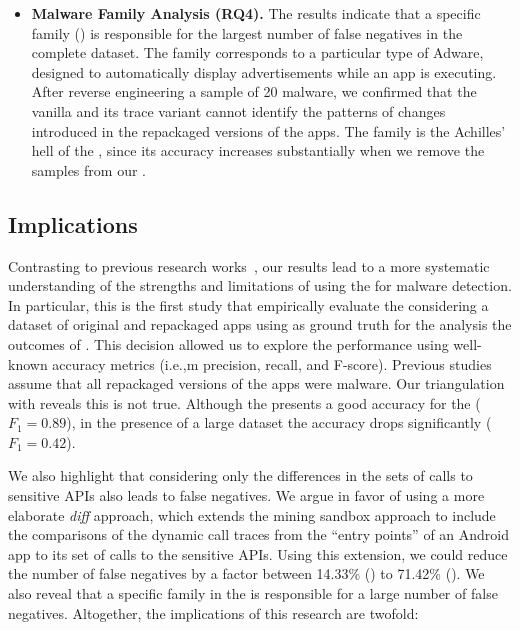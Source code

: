 \begin{itemize}
\item \textbf{Malware Family Analysis (RQ4).} The results indicate that a specific family
  (\gps)  is responsible for the largest number of false
  negatives in the complete dataset. The \gps family corresponds to a particular type of
  Adware, designed to automatically display advertisements while an app is executing. After reverse engineering
  a sample of 20 \gps malware, we confirmed that the vanilla \mas and its trace variant cannot identify the
  patterns of changes introduced in the repackaged versions of the apps. The \gps family
  is the Achilles' hell of the \mas, since its accuracy increases substantially
  when we remove the \gps samples from our \cds.  
\end{itemize}


\subsection{Implications}\label{sec:implications} 

Contrasting to previous research works~\cite{DBLP:conf/wcre/BaoLL18,DBLP:conf/iceccs/LeB0GL18,DBLP:journals/jss/CostaMMSSBNR22},
our results 
lead to a more systematic understanding
of the strengths and limitations of using the \mas
for malware detection. In particular, this is the
first study that empirically evaluate the \mas
considering a dataset of original and repackaged
apps using as ground truth for the analysis the outcomes
of \vt. This decision allowed us to explore the
\mas performance using well-known accuracy metrics (i.e.,m precision, recall, and
F-score). Previous studies assume that all repackaged versions of the
apps were malware. Our triangulation with \vt reveals this is not true. Although
the \mas presents a good accuracy for the \cds ($F_1 = 0.89$), 
in the presence of a large dataset the \mas accuracy drops significantly ($F_1 = 0.42$). 

We also highlight that considering only the differences in the
sets of calls to sensitive APIs also leads to false negatives. We
argue in favor of using a more elaborate \emph{diff} approach, which
extends the mining sandbox approach to include the comparisons of
the dynamic call traces from the ``entry points'' of an Android app to its
set of calls to the sensitive APIs. Using this extension, we could reduce
the number of false negatives by a factor
between 14.33\% (\cds) to 71.42\% (\sds). We also reveal that
a specific family in the \cds is responsible for a large number of
false negatives. 
Altogether, the implications of this research are twofold:

